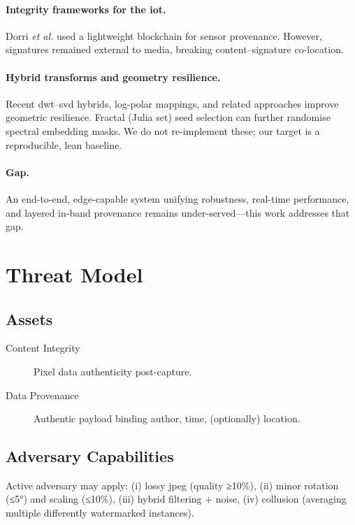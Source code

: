 \paragraph{Integrity frameworks for the \gls{iot}.} Dorri \emph{et al.} \cite{dorri2017blockchain} used a lightweight blockchain for sensor provenance.
However, signatures remained external to media, breaking content–signature co-location.

\paragraph{Hybrid transforms and geometry resilience.} Recent \gls{dwt}–\gls{svd} hybrids, log-polar mappings, and related approaches \cite{plosone2014dwtSvdChaos} improve geometric resilience. Fractal (Julia set) seed selection can further randomise spectral embedding masks.
We do not re-implement these; our target is a reproducible, lean baseline.

\paragraph{Gap.} An end-to-end, edge-capable system unifying robustness, real-time performance, and layered in-band provenance remains under-served—this work addresses that gap.

\section{Threat Model}
\label{sec:deep_dive:threat}

\subsection{Assets}\label{subsec:assets}
\begin{description}
  \item[Content Integrity] Pixel data authenticity post-capture.
  \item[Data Provenance] Authentic payload binding author, time, (optionally) location.
\end{description}

\subsection{Adversary Capabilities}\label{subsec:adversary-capabilities}
Active adversary may apply: (i) lossy \gls{jpeg} (quality ≥10\%), (ii) minor rotation (≤5°) and scaling (≤10\%), (iii) hybrid filtering + noise, (iv) collusion (averaging multiple differently watermarked instances).


